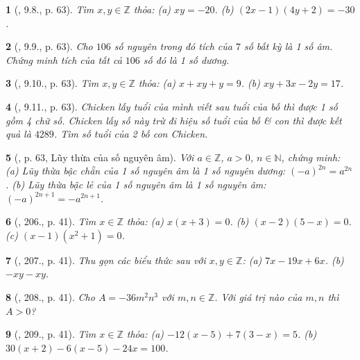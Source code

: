 \documentclass{article}
\newtheorem{baitoan}{}
\begin{document}
\begin{baitoan}[\cite{Binh_boi_duong_Toan_6_tap_1}, 9.8., p. 63]
	Tìm $x,y\in\mathbb{Z}$ thỏa: (a) $xy = -20$. (b) $(2x - 1)(4y + 2) = -30$.
\end{baitoan}

\begin{baitoan}[\cite{Binh_boi_duong_Toan_6_tap_1}, 9.9., p. 63]
	Cho $106$ số nguyên trong đó tích của $7$ số bất kỳ là 1 số âm. Chứng minh tích của tất cả $106$ số đó là 1 số dương.
\end{baitoan}

\begin{baitoan}[\cite{Binh_boi_duong_Toan_6_tap_1}, 9.10., p. 63]
	Tìm $x,y\in\mathbb{Z}$ thỏa: (a) $x + xy + y = 9$. (b) $xy + 3x - 2y = 17$.
\end{baitoan}

\begin{baitoan}[\cite{Binh_boi_duong_Toan_6_tap_1}, 9.11., p. 63]
	Chicken lấy tuổi của mình viết sau tuổi của bố thì được 1 số gồm 4 chữ số. Chicken lấy số này trừ đi hiệu số tuổi của bố \& con thì được kết quả là $4289$. Tìm số tuổi của 2 bố con Chicken.
\end{baitoan}

\begin{baitoan}[\cite{Binh_boi_duong_Toan_6_tap_1}, p. 63, Lũy thừa của số nguyên âm]
	Với $a\in\mathbb{Z}$, $a > 0$, $n\in\mathbb{N}$, chứng minh: (a) Lũy thừa bậc chẵn của 1 số nguyên âm là 1 số nguyên dương: $(-a)^{2n} = a^{2n}$. (b) Lũy thừa bậc lẻ của 1 số nguyên âm là 1 số nguyên âm: $(-a)^{2n + 1} = -a^{2n + 1}$.
\end{baitoan}

\begin{baitoan}[\cite{Tuyen_Toan_6}, 206., p. 41]
	Tìm $x\in\mathbb{Z}$ thỏa: (a) $x(x + 3) = 0$. (b) $(x - 2)(5 - x) = 0$. (c) $(x - 1)(x^2 + 1) = 0$.
\end{baitoan}

\begin{baitoan}[\cite{Tuyen_Toan_6}, 207., p. 41]
	Thu gọn các biểu thức sau với $x,y\in\mathbb{Z}$: (a) $7x - 19x + 6x$. (b) $-xy - xy$.
\end{baitoan}

\begin{baitoan}[\cite{Tuyen_Toan_6}, 208., p. 41]
	Cho $A = -36m^2n^3$ với $m,n\in\mathbb{Z}$. Với giá trị nào của $m,n$ thì $A > 0$?
\end{baitoan}

\begin{baitoan}[\cite{Tuyen_Toan_6}, 209., p. 41]
	Tìm $x\in\mathbb{Z}$ thỏa: (a) $-12(x - 5) + 7(3 - x) = 5$. (b) $30(x + 2) - 6(x - 5) - 24x = 100$.
\end{baitoan}
\end{document}
